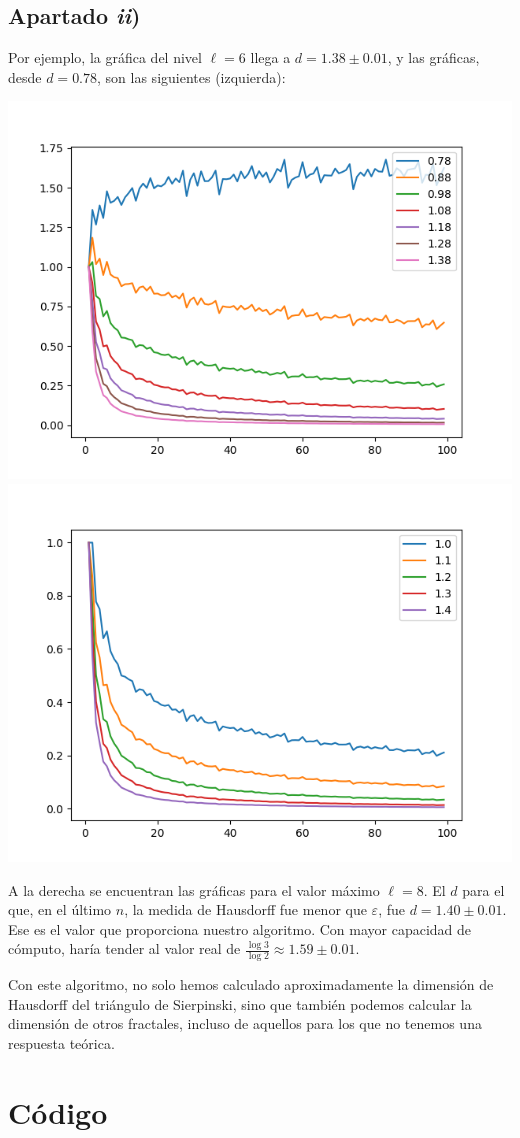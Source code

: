 \documentclass[a4paper]{article}
\begin{document}
	\subsection{Apartado \textit{ii})}
	Por ejemplo, la gráfica del nivel $\ell=6$ llega a $d=1.38\pm 0.01$, y las gráficas, desde $d=0.78$, son las siguientes (izquierda):
	
	\begin{multicols}{2}
		\includegraphics[width=0.95\linewidth]{img/6}	
		\includegraphics[width=0.95\linewidth]{img/9}			
	\end{multicols}

	A la derecha se encuentran las gráficas para el valor máximo $\ell=8$. El $d$ para el que, en el último $n$, la medida de Hausdorff fue menor que $\varepsilon$, fue $d=1.40\pm0.01$. Ese es el valor que proporciona nuestro algoritmo. Con mayor capacidad de cómputo, haría tender al valor real de $\frac{\log 3}{\log 2} \approx 1.59 \pm 0.01$.
	
	Con este algoritmo, no solo hemos calculado aproximadamente la dimensión de Hausdorff del triángulo de Sierpinski, sino que también podemos calcular la dimensión de otros fractales, incluso de aquellos para los que no tenemos una respuesta teórica.
	
	\newpage
	\section{Código}\label{codigo}
	
	
	
\end{document}
